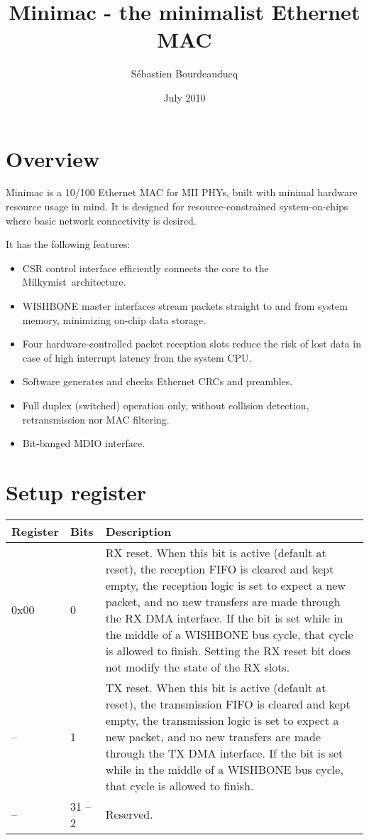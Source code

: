 \documentclass[a4paper,11pt]{article}
\title{Minimac - the minimalist Ethernet MAC}
\author{S\'ebastien Bourdeauducq}
\date{July 2010}
\begin{document}
\setlength{\parindent}{0pt}
\setlength{\parskip}{5pt}
\maketitle{}
\section{Overview}
Minimac is a 10/100 Ethernet MAC for MII PHYs, built with minimal hardware resource usage in mind. It is designed for resource-constrained system-on-chips where basic network connectivity is desired.

It has the following features:
\begin{itemize}
\item CSR control interface efficiently connects the core to the Milkymist\texttrademark~architecture.
\item WISHBONE master interfaces stream packets straight to and from system memory, minimizing on-chip data storage.
\item Four hardware-controlled packet reception slots reduce the risk of lost data in case of high interrupt latency from the system CPU.
\item Software generates and checks Ethernet CRCs and preambles.
\item Full duplex (switched) operation only, without collision detection, retransmission nor MAC filtering.
\item Bit-banged MDIO interface.
\end{itemize}

\section{Setup register}

\begin{tabularx}{450pt}{|l|l|X|}
\hline
\textbf{Register} & \textbf{Bits} & \textbf{Description} \\
\hline
0x00 & 0 & RX reset. When this bit is active (default at reset), the reception FIFO is cleared and kept empty, the reception logic is set to expect a new packet, and no new transfers are made through the RX DMA interface. If the bit is set while in the middle of a WISHBONE bus cycle, that cycle is allowed to finish. Setting the RX reset bit does not modify the state of the RX slots. \\
\hline
-- & 1 & TX reset. When this bit is active (default at reset), the transmission FIFO is cleared and kept empty, the transmission logic is set to expect a new packet, and no new transfers are made through the TX DMA interface. If the bit is set while in the middle of a WISHBONE bus cycle, that cycle is allowed to finish. \\
\hline
-- & 31 -- 2 & Reserved. \\
\hline
\end{tabularx}
\end{document}
